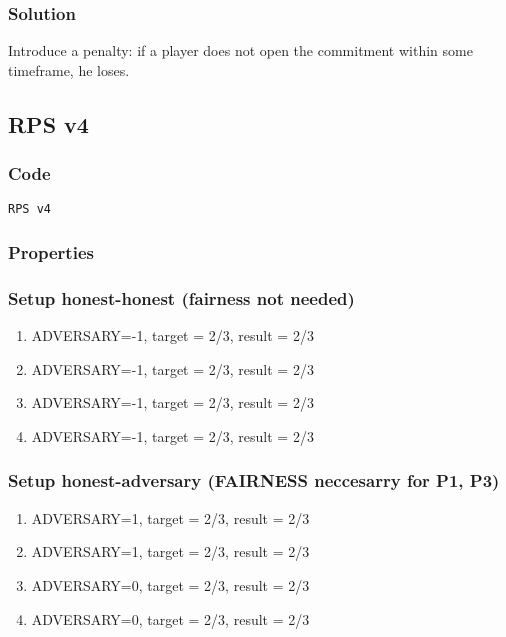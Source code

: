 \documentclass{article}
\begin{document}
\subsubsection{Solution}
Introduce a penalty: if a player does not open the commitment within some timeframe, he loses.

\subsection{RPS v4}
\subsubsection{Code}

%
\begin{lstlisting}[caption=RPS v4, label=lst:rps_v4]
RPS v4
\end{lstlisting}

\subsubsection{Properties}



\subsubsection{Setup honest-honest (fairness not needed)}

\begin{enumerate}
\item ADVERSARY=-1, target = 2/3, result = 2/3
\item ADVERSARY=-1, target = 2/3, result = 2/3
\item ADVERSARY=-1, target = 2/3, result = 2/3
\item ADVERSARY=-1, target = 2/3, result = 2/3
\end{enumerate}

\subsubsection{Setup honest-adversary (FAIRNESS neccesarry for P1, P3)}

\begin{enumerate}
\item ADVERSARY=1, target = 2/3, result = 2/3
\item ADVERSARY=1, target = 2/3, result = 2/3
\item ADVERSARY=0, target = 2/3, result = 2/3
\item ADVERSARY=0, target = 2/3, result = 2/3
\end{enumerate}
\end{document}
